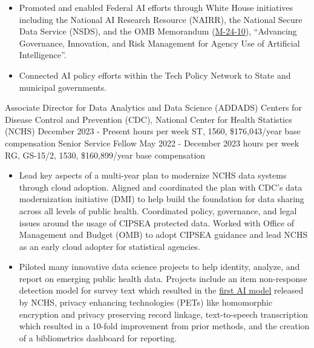 \documentclass[]{scrartcl}
\begin{document}
\begin{cleanCV}
{\begin{itemize}
  \item Promoted and enabled Federal AI efforts through White House initiatives including the National AI Research Resource (NAIRR), the National Secure Data Service (NSDS), and the OMB Memorandum (\href{https://www.whitehouse.gov/wp-content/uploads/2024/03/M-24-10-Advancing-Governance-Innovation-and-Risk-Management-for-Agency-Use-of-Artificial-Intelligence.pdf}{M-24-10}), ``Advancing Governance, Innovation, and Risk Management for Agency Use of Artificial Intelligence''.
  \item Connected AI policy efforts within the Tech Policy Network to State and municipal governments.
  \end{itemize}
}

\WorkExperience
{}
{Associate Director for Data Analytics and Data Science (ADDADS)}
{
  \newline Centers for Disease Control and Prevention (CDC), National Center for Health Statistics (NCHS)
  \newline December 2023 - Present
   hours per week
  \newline ST, 1560, \$176,043/year base compensation
  \newline
  \newline Senior Service Fellow
  \newline May 2022 - December 2023
   hours per week
  \newline RG, GS-15/2, 1530, \$160,899/year base compensation
}
{
  \vspace{-0.25em}
  \begin{itemize}

  \item Lead key aspects of a multi-year plan to modernize NCHS data systems through cloud adoption. Aligned and coordinated the plan with CDC's data modernization initiative (DMI) to help build the foundation for data sharing across all levels of public health. Coordinated policy, governance, and legal issues around the usage of CIPSEA protected data. Worked with Office of Management and Budget (OMB) to adopt CIPSEA guidance and lead NCHS as an early cloud adopter for statistical agencies.
    
        \item Piloted many innovative data science projects to help identity, analyze, and report on emerging public health data. Projects include an item non-response detection model for survey text which resulted in the \href{https://www.cdc.gov/nchs/data-science/SANDS-model-context.htm}{first AI model} released by NCHS, privacy enhancing technologies (PETs) like homomorphic encryption and privacy preserving record linkage, text-to-speech transcription which resulted in a 10-fold improvement from prior methods, and the creation of a bibliometrics dashboard for reporting.
    

\end{itemize}}
\end{cleanCV}
\end{document}
